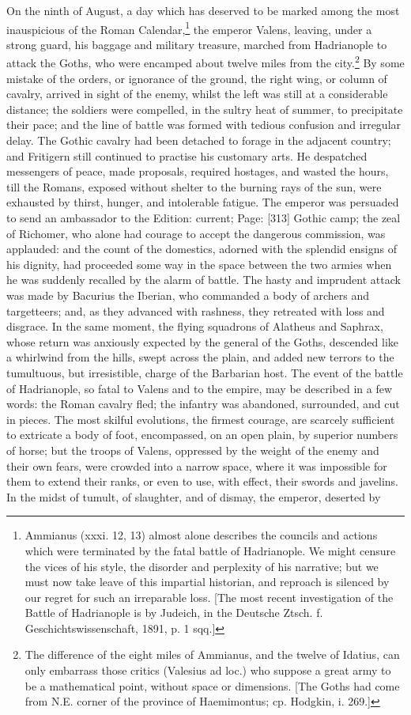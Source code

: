 On the ninth of August, a day which has deserved to be marked among the most inauspicious of the Roman Calendar,\footnote{Ammianus (xxxi. 12, 13) almost alone describes the councils and actions which were terminated by the fatal battle of Hadrianople. We might censure the vices of his style, the disorder and perplexity of his narrative; but we must now take leave of this impartial historian, and reproach is silenced by our regret for such an irreparable loss. [The most recent investigation of the Battle of Hadrianople is by Judeich, in the Deutsche Ztsch. f. Geschichtswissenschaft, 1891, p. 1 sqq.]} the emperor Valens, leaving, under a strong guard, his baggage and military treasure, marched from Hadrianople to attack the Goths, who were encamped about twelve miles from the city.\footnote{The difference of the eight miles of Ammianus, and the twelve of Idatius, can only embarrass those critics (Valesius ad loc.) who suppose a great army to be a mathematical point, without space or dimensions. [The Goths had come from N.E. corner of the province of Haemimontus; cp. Hodgkin, i. 269.]} By some mistake of the orders, or ignorance of the ground, the right wing, or column of cavalry, arrived in sight of the enemy, whilst the left was still at a considerable distance; the soldiers were compelled, in the sultry heat of summer, to precipitate their pace; and the line of battle was formed with tedious confusion and irregular delay. The Gothic cavalry had been detached to forage in the adjacent country; and Fritigern still continued to practise his customary arts. He despatched messengers of peace, made proposals, required hostages, and wasted the hours, till the Romans, exposed without shelter to the burning rays of the sun, were exhausted by thirst, hunger, and intolerable fatigue. The emperor was persuaded to send an ambassador to the Edition: current; Page: [313] Gothic camp; the zeal of Richomer, who alone had courage to accept the dangerous commission, was applauded: and the count of the domestics, adorned with the splendid ensigns of his dignity, had proceeded some way in the space between the two armies when he was suddenly recalled by the alarm of battle. The hasty and imprudent attack was made by Bacurius the Iberian, who commanded a body of archers and targetteers; and, as they advanced with rashness, they retreated with loss and disgrace. In the same moment, the flying squadrons of Alatheus and Saphrax, whose return was anxiously expected by the general of the Goths, descended like a whirlwind from the hills, swept across the plain, and added new terrors to the tumultuous, but irresistible, charge of the Barbarian host. The event of the battle of Hadrianople, so fatal to Valens and to the empire, may be described in a few words: the Roman cavalry fled; the infantry was abandoned, surrounded, and cut in pieces. The most skilful evolutions, the firmest courage, are scarcely sufficient to extricate a body of foot, encompassed, on an open plain, by superior numbers of horse; but the troops of Valens, oppressed by the weight of the enemy and their own fears, were crowded into a narrow space, where it was impossible for them to extend their ranks, or even to use, with effect, their swords and javelins. In the midst of tumult, of slaughter, and of dismay, the emperor, deserted by 